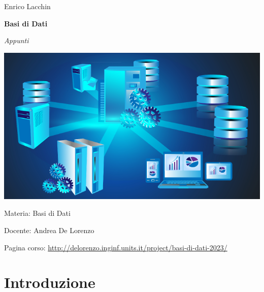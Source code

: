 \documentclass[12pt,a4paper]{article}
\begin{document}
\setlength{\parindent}{0cm}


\small{Enrico Lacchin}

\MidSep
\textbf{\LARGE{Basi di Dati}}

\MidSep
\textit{\Large{Appunti}}
\Sep

\begin{center}
\includegraphics[width=1\columnwidth]{img/database.png}
\end{center}

\vfill
Materia: Basi di Dati

Docente: Andrea De Lorenzo

Pagina corso: \url{http://delorenzo.inginf.units.it/project/basi-di-dati-2023/}


\clearpage
{}
\setcounter{page}{1}
\tableofcontents

\clearpage

\setcounter{page}{1}

\section{Introduzione}
\end{document}
